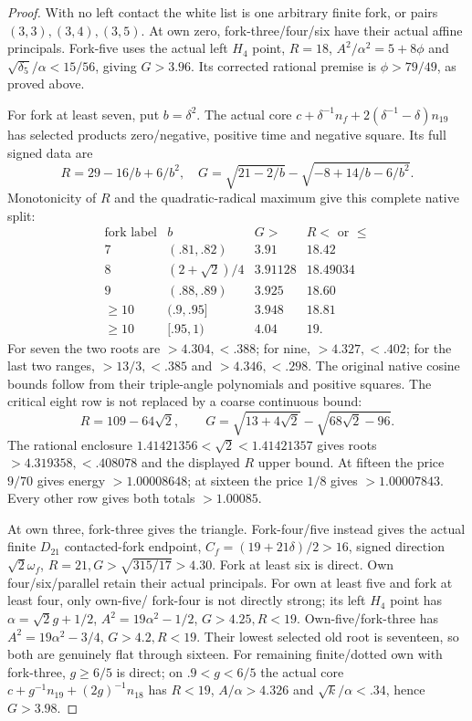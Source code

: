 \documentclass[11pt]{article}
\theoremstyle{definition}
\theoremstyle{remark}
\begin{document}
\begin{proof}
With no left contact the white list is one arbitrary finite fork,
or pairs $(3,3),(3,4),(3,5)$. At own zero, fork-three/four/six
have their actual affine principals. Fork-five uses the actual
left $H_4$ point, $R=18$, $A^2/\alpha^2=5+8\phi$ and
$\sqrt{\delta_5}/\alpha<15/56$, giving $G>3.96$.
Its corrected rational premise is $\phi>79/49$, as proved above.

For fork at least seven, put $b=\delta^2$. The actual core
$c+\delta^{-1}n_f+2(\delta^{-1}-\delta)n_{19}$ has selected
products zero/negative, positive time and negative square.
Its full signed data are
\[
 R=29-16/b+6/b^2,\quad
 G=\sqrt{21-2/b}-\sqrt{-8+14/b-6/b^2}.
\]
Monotonicity of $R$ and the quadratic-radical maximum give this
complete native split:
\[
\begin{array}{c|c|c|c}
\text{fork label}&b&G>&R<\text{ or }\le\\\hline
7&(.81,.82)&3.91&18.42\\
8&(2+\sqrt2)/4&3.91128&18.49034\\
9&(.88,.89)&3.925&18.60\\
\ge10&(.9,.95]&3.948&18.81\\
\ge10&[.95,1)&4.04&19 .
\end{array}
\]
For seven the two roots are $>4.304,<.388$; for nine,
$>4.327,<.402$; for the last two ranges, $>13/3,<.385$ and
$>4.346,<.298$. The original native cosine bounds follow from
their triple-angle polynomials and positive squares.
The critical eight row is not replaced by a coarse continuous bound:
\[
 R=109-64\sqrt2,\qquad
 G=\sqrt{13+4\sqrt2}-\sqrt{68\sqrt2-96}.
\]
The rational enclosure $1.41421356<\sqrt2<1.41421357$ gives
roots $>4.319358,<.408078$ and the displayed $R$ upper bound.
At fifteen the price $9/70$ gives energy $>1.00008648$;
at sixteen the price $1/8$ gives $>1.00007843$.
Every other row gives both totals $>1.00085$.

At own three, fork-three gives the triangle. Fork-four/five instead
gives the actual finite $D_{21}$ contacted-fork endpoint,
$C_f=(19+21\delta)/2>16$, signed direction $\sqrt2\omega_f$,
$R=21,G>\sqrt{315/17}>4.30$. Fork at least six is direct.
Own four/six/parallel retain their actual principals.
For own at least five and fork at least four, only own-five/
fork-four is not directly strong; its left $H_4$ point has
$\alpha=\sqrt2g+1/2$, $A^2=19\alpha^2-1/2$, $G>4.25,R<19$.
Own-five/fork-three has $A^2=19\alpha^2-3/4$, $G>4.2,R<19$.
Their lowest selected old root is seventeen, so both are genuinely
flat through sixteen. For remaining finite/dotted own with fork-three,
$g\ge6/5$ is direct; on $.9<g<6/5$ the actual core
$c+g^{-1}n_{19}+(2g)^{-1}n_{18}$ has $R<19$,
$A/\alpha>4.326$ and $\sqrt{k}/\alpha<.34$, hence $G>3.98$.


\end{proof}
\end{document}
